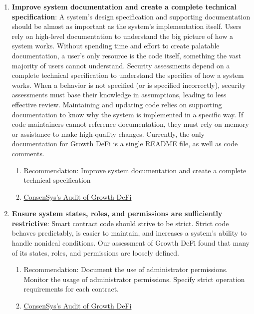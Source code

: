 \begin{enumerate}
\item\textbf{Improve system documentation and create a complete technical specification}: A system’s design specification and supporting documentation should be almost as important as the system’s implementation itself. Users rely on high-level documentation to understand the big picture of how a system works. Without spending time and effort to create palatable documentation, a user’s only resource is the code itself, something the vast majority of users cannot understand. Security assessments depend on a complete technical specification to understand the specifics of how a system works. When a behavior is not specified (or is specified incorrectly), security assessments must base their knowledge in assumptions, leading to less effective review. Maintaining and updating code relies on supporting documentation to know why the system is implemented in a specific way. If code maintainers cannot reference documentation, they must rely on memory or assistance to make high-quality changes. Currently, the only documentation for Growth DeFi is a single README file, as well as code comments.
	\begin{enumerate}
	\item Recommendation: Improve system documentation and create a complete technical specification
	\item\href{https://consensys.net/diligence/audits/2020/12/growth-defi-v1/\#improve-system-documentation-and-create-a-complete-technical-specification}{ConsenSys's Audit of Growth DeFi}
	\end{enumerate}

\item\textbf{Ensure system states, roles, and permissions are sufficiently restrictive}: Smart contract code should strive to be strict. Strict code behaves predictably, is easier to maintain, and increases a system’s ability to handle nonideal conditions. Our assessment of Growth DeFi found that many of its states, roles, and permissions are loosely defined.
	\begin{enumerate}
	\item Recommendation: Document the use of administrator permissions. Monitor the usage of administrator permissions. Specify strict operation requirements for each contract.
	\item\href{https://consensys.net/diligence/audits/2020/12/growth-defi-v1/\#ensure-system-states-roles-and-permissions-are-sufficiently-restrictive}{ConsenSys's Audit of Growth DeFi}
	\end{enumerate}


\end{enumerate}
